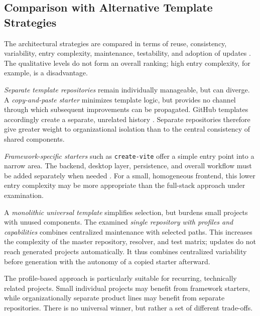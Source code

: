 \subsection{Comparison with Alternative Template Strategies}
\label{subsec:vergleich-template-strategien}

The architectural strategies are compared in terms of reuse, consistency,
variability, entry complexity, maintenance, testability, and adoption of
updates
\parencite{krueger1992software-reuse,clements2001software-product-lines}.
The qualitative levels do not form an overall ranking; high entry complexity,
for example, is a disadvantage.

\emph{Separate template repositories} remain individually manageable, but can
diverge. A \emph{copy-and-paste starter} minimizes template logic, but provides
no channel through which subsequent improvements can be propagated. GitHub
templates accordingly create a separate, unrelated history
\parencite{github2026repository-template}.
Separate repositories therefore give greater weight to organizational
isolation than to the central consistency of shared components.

\emph{Framework-specific starters} such as \texttt{create-vite} offer a simple
entry point into a narrow area. The backend, desktop layer, persistence, and
overall workflow must be added separately when needed
\parencite{vite2026guide}.
For a small, homogeneous frontend, this lower entry complexity may be more
appropriate than the full-stack approach under examination.

A \emph{monolithic universal template} simplifies selection, but burdens small
projects with unused components. The examined \emph{single repository with
profiles and capabilities} combines centralized maintenance with selected
paths. This increases the complexity of the master repository, resolver, and
test matrix; updates do not reach generated projects automatically.
It thus combines centralized variability before generation with the autonomy
of a copied starter afterward.



The profile-based approach is particularly suitable for recurring,
technically related projects. Small individual projects may benefit from
framework starters, while organizationally separate product lines may benefit
from separate repositories. There is no universal winner, but rather a set of
different trade-offs.
